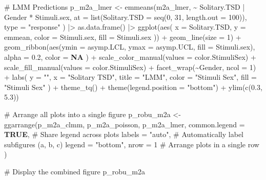 \documentclass[
  bookmarksnumbered]{article}
\newenvironment{Shaded}{\begin{snugshade}}{\end{snugshade}}
\newcommand{\AttributeTok}[1]{\textcolor[rgb]{0.80,0.80,0.80}{#1}}
\newcommand{\CommentTok}[1]{\textcolor[rgb]{0.50,0.62,0.50}{#1}}
\newcommand{\ConstantTok}[1]{\textcolor[rgb]{0.86,0.64,0.64}{\textbf{#1}}}
\newcommand{\DecValTok}[1]{\textcolor[rgb]{0.86,0.86,0.80}{#1}}
\newcommand{\FloatTok}[1]{\textcolor[rgb]{0.75,0.75,0.82}{#1}}
\newcommand{\FunctionTok}[1]{\textcolor[rgb]{0.94,0.94,0.56}{#1}}
\newcommand{\NormalTok}[1]{\textcolor[rgb]{0.80,0.80,0.80}{#1}}
\newcommand{\OtherTok}[1]{\textcolor[rgb]{0.94,0.94,0.56}{#1}}
\newcommand{\SpecialCharTok}[1]{\textcolor[rgb]{0.86,0.64,0.64}{#1}}
\newcommand{\StringTok}[1]{\textcolor[rgb]{0.80,0.58,0.58}{#1}}
\begin{document}
\begin{Shaded}
\begin{Highlighting}[]
\CommentTok{\# LMM Predictions}
\NormalTok{p\_m2a\_lmer }\OtherTok{\textless{}{-}} \FunctionTok{emmeans}\NormalTok{(m2a\_lmer, }\SpecialCharTok{\textasciitilde{}}\NormalTok{ Solitary.TSD }\SpecialCharTok{|}\NormalTok{ Gender }\SpecialCharTok{*}\NormalTok{ Stimuli.sex,}
  \AttributeTok{at =} \FunctionTok{list}\NormalTok{(}\AttributeTok{Solitary.TSD =} \FunctionTok{seq}\NormalTok{(}\DecValTok{0}\NormalTok{, }\DecValTok{31}\NormalTok{, }\AttributeTok{length.out =} \DecValTok{100}\NormalTok{)),}
  \AttributeTok{type =} \StringTok{"response"}
\NormalTok{) }\SpecialCharTok{|\textgreater{}}
  \FunctionTok{as.data.frame}\NormalTok{() }\SpecialCharTok{|\textgreater{}}
  \FunctionTok{ggplot}\NormalTok{(}\FunctionTok{aes}\NormalTok{(}
    \AttributeTok{x =}\NormalTok{ Solitary.TSD, }\AttributeTok{y =}\NormalTok{ emmean,}
    \AttributeTok{color =}\NormalTok{ Stimuli.sex, }\AttributeTok{fill =}\NormalTok{ Stimuli.sex}
\NormalTok{  )) }\SpecialCharTok{+}
  \FunctionTok{geom\_line}\NormalTok{(}\AttributeTok{size =} \DecValTok{1}\NormalTok{) }\SpecialCharTok{+}
  \FunctionTok{geom\_ribbon}\NormalTok{(}\FunctionTok{aes}\NormalTok{(}\AttributeTok{ymin =}\NormalTok{ asymp.LCL, }\AttributeTok{ymax =}\NormalTok{ asymp.UCL, }\AttributeTok{fill =}\NormalTok{ Stimuli.sex),}
    \AttributeTok{alpha =} \FloatTok{0.2}\NormalTok{, }\AttributeTok{color =} \ConstantTok{NA}
\NormalTok{  ) }\SpecialCharTok{+}
  \FunctionTok{scale\_color\_manual}\NormalTok{(}\AttributeTok{values =}\NormalTok{ color.StimuliSex) }\SpecialCharTok{+}
  \FunctionTok{scale\_fill\_manual}\NormalTok{(}\AttributeTok{values =}\NormalTok{ color.StimuliSex) }\SpecialCharTok{+}
  \FunctionTok{facet\_wrap}\NormalTok{(}\SpecialCharTok{\textasciitilde{}}\NormalTok{Gender, }\AttributeTok{ncol =} \DecValTok{1}\NormalTok{) }\SpecialCharTok{+}
  \FunctionTok{labs}\NormalTok{(}
    \AttributeTok{y =} \StringTok{""}\NormalTok{, }\AttributeTok{x =} \StringTok{"Solitary TSD"}\NormalTok{, }\AttributeTok{title =} \StringTok{"LMM"}\NormalTok{,}
    \AttributeTok{color =} \StringTok{"Stimuli Sex"}\NormalTok{, }\AttributeTok{fill =} \StringTok{"Stimuli Sex"}
\NormalTok{  ) }\SpecialCharTok{+}
  \FunctionTok{theme\_tq}\NormalTok{() }\SpecialCharTok{+}
  \FunctionTok{theme}\NormalTok{(}\AttributeTok{legend.position =} \StringTok{"bottom"}\NormalTok{) }\SpecialCharTok{+}
  \FunctionTok{ylim}\NormalTok{(}\FunctionTok{c}\NormalTok{(}\FloatTok{0.3}\NormalTok{, }\FloatTok{5.3}\NormalTok{))}

\CommentTok{\# Arrange all plots into a single figure}
\NormalTok{p\_robu\_m2a }\OtherTok{\textless{}{-}} \FunctionTok{ggarrange}\NormalTok{(p\_m2a\_clmm, p\_m2a\_poisson, p\_m2a\_lmer,}
  \AttributeTok{common.legend =} \ConstantTok{TRUE}\NormalTok{, }\CommentTok{\# Share legend across plots}
  \AttributeTok{labels =} \StringTok{"auto"}\NormalTok{, }\CommentTok{\# Automatically label subfigures (a, b, c)}
  \AttributeTok{legend =} \StringTok{"bottom"}\NormalTok{,}
  \AttributeTok{nrow =} \DecValTok{1} \CommentTok{\# Arrange plots in a single row}
\NormalTok{)}

\CommentTok{\# Display the combined figure}
\NormalTok{p\_robu\_m2a}
\end{Highlighting}
\end{Shaded}
\end{document}
